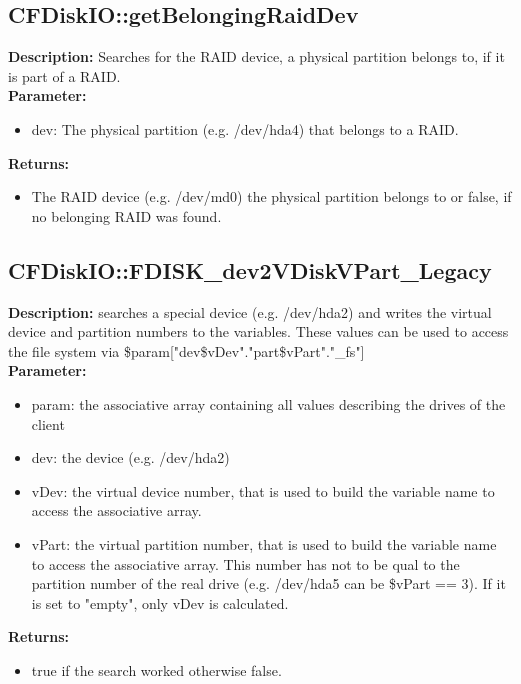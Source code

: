 \subsection{CFDiskIO::getBelongingRaidDev}
\textbf{Description:} Searches for the RAID device, a physical partition belongs to, if it is part of a RAID.\\
\textbf{Parameter:}
\begin{itemize}
\item dev: The physical partition (e.g. /dev/hda4) that belongs to a RAID.
\end{itemize}
\textbf{Returns:}
\begin{itemize}
\item The RAID device (e.g. /dev/md0) the physical partition belongs to or false, if no belonging RAID was found.
\end{itemize}

\subsection{CFDiskIO::FDISK\_dev2VDiskVPart\_Legacy}
\textbf{Description:} searches a special device (e.g. /dev/hda2) and writes the virtual device and partition numbers to the variables. These values can be used to access the file system via \$param["dev\$vDev"."part\$vPart"."\_fs"]\\
\textbf{Parameter:}
\begin{itemize}
\item param: the associative array containing all values describing the drives of the client
\item dev: the device (e.g. /dev/hda2)
\item vDev: the virtual device number, that is used to build the variable name to access the associative array.
\item vPart: the virtual partition number, that is used to build the variable name to access the associative array. This number has not to be qual to the partition number of the real drive (e.g. /dev/hda5 can be \$vPart == 3). If it is set to "empty", only vDev is calculated.
\end{itemize}
\textbf{Returns:}
\begin{itemize}
\item true if the search worked otherwise false.
\end{itemize}


